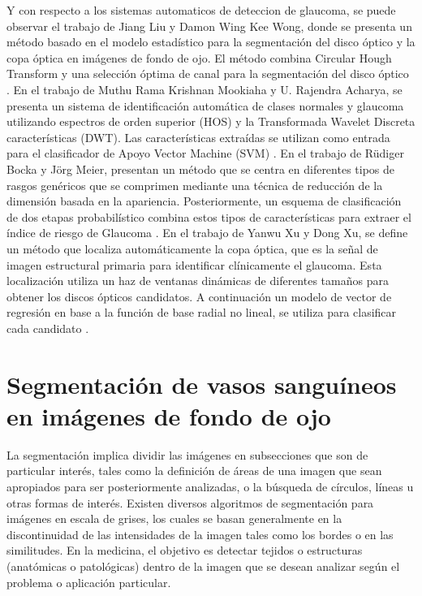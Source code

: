 Y con respecto a los sistemas automaticos de deteccion de glaucoma, se puede observar el trabajo de Jiang Liu y Damon Wing Kee Wong, donde se presenta un m\'etodo basado en el modelo estad\'istico para la segmentaci\'on del disco \'optico y la copa \'optica en im\'agenes de fondo de ojo. El m\'etodo combina Circular Hough Transform y una selecci\'on \'optima de canal para la segmentaci\'on del disco \'optico \cite{yin2012automated}. En el trabajo de Muthu Rama Krishnan Mookiaha y U. Rajendra Acharya, se presenta un sistema de identificaci\'on autom\'atica de clases normales y glaucoma utilizando espectros de orden superior (HOS) y la Transformada Wavelet Discreta caracter\'isticas (DWT). Las caracter\'isticas extra\'idas se utilizan como entrada para el clasificador de Apoyo Vector Machine (SVM) \cite{mookiah2012data}. En el trabajo de Rüdiger Bocka y Jörg Meier, presentan un m\'etodo que se centra en diferentes tipos de rasgos gen\'ericos que se comprimen mediante una t\'ecnica de reducci\'on de la dimensi\'on basada en la apariencia. Posteriormente, un esquema de clasificaci\'on de dos etapas probabil\'istico combina estos tipos de caracter\'isticas para extraer el \'indice de riesgo de Glaucoma \cite{bock2010glaucoma}. En el trabajo de Yanwu Xu y  Dong Xu, se define un m\'etodo que localiza autom\'aticamente la copa \'optica, que es la señal de imagen estructural primaria para identificar cl\'inicamente el glaucoma. Esta localizaci\'on utiliza un haz de ventanas din\'amicas de diferentes tamaños para obtener los discos \'opticos candidatos. A continuaci\'on  un modelo de vector de regresi\'on en base a la funci\'on de base radial no lineal, se utiliza para clasificar cada candidato \cite{xu2011sliding}.


\section{Segmentaci\'on de vasos sangu\'ineos en im\'agenes de fondo de ojo}
La segmentaci\'on implica dividir las im\'agenes en subsecciones que son de particular inter\'es, tales como la definici\'on de \'areas de una imagen que sean apropiados para ser posteriormente analizadas, o la b\'usqueda de c\'irculos, l\'ineas u otras formas de inter\'es. Existen diversos algoritmos de segmentaci\'on para im\'agenes en escala de grises, los cuales se basan generalmente en la discontinuidad de las intensidades de la imagen tales como los bordes o en las similitudes. En la medicina, el objetivo es detectar tejidos o estructuras (anat\'omicas o patol\'ogicas) dentro de la imagen que se desean analizar seg\'un el problema o aplicaci\'on particular.

